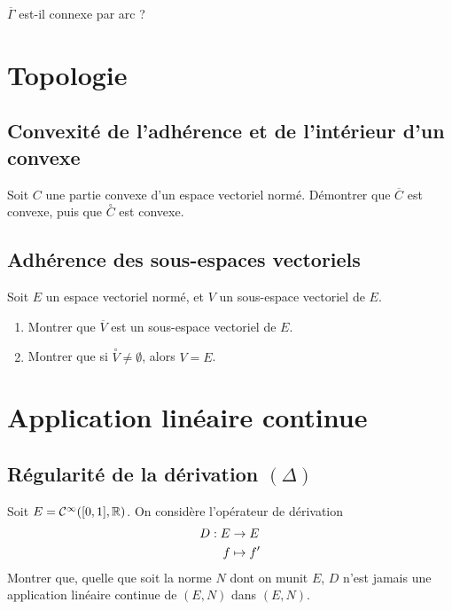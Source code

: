 \bigskip

$\overline{\Gamma}$ est-il connexe par arc ?

\section{Topologie}

\subsection{Convexité de l'adhérence et de l'intérieur d'un convexe}
Soit $C$ une partie convexe d'un espace vectoriel normé. Démontrer que $\overline{C}$ est convexe, puis que $\overset{\circ}{C}$ est convexe.

\subsection{Adhérence des sous-espaces vectoriels}
Soit $E$ un espace vectoriel normé, et $V$ un sous-espace vectoriel de $E$.
\begin{enumerate}
    \item Montrer que  $\overline{V}$ est un sous-espace vectoriel de $E$.
    \item Montrer que si $\overset{\circ}{V}\neq \emptyset$, alors $V=E$.
\end{enumerate}

\section{Application linéaire continue}

\subsection{Régularité de la dérivation \texorpdfstring{$(\Delta)$}{Delta}}
Soit $E=\mathcal{C}^\infty([0,1],\mathbb{R})$. On considère l'opérateur de dérivation 
\[
    \begin{aligned}
        D: E &\rightarrow E\\
        f&\mapsto f'
    \end{aligned}
\]
Montrer que, quelle que soit la norme $N$ dont on munit $E$, $D$ n'est jamais une application linéaire continue de $(E,N)$ dans $(E,N)$.

